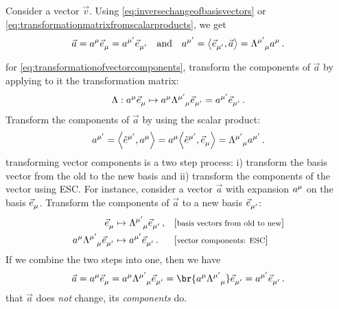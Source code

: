  Consider a vector $\vec v$. Using \cref{eq:inversechangeofbasisvectors} or \cref{eq:transformationmatrixfromscalarproducts}, we get
%
\begin{equation}\label{eq:transformationofvectorcomponents}
  \vec a = \tvec a\mu\tbvec\mu = \tvec a{\aidx\mu}\tbvec{\aidx\mu}\quad\text{and}\quad
  \tvec a{\aidx\mu} = \sprod{\tbvec{\aidx\mu}}{\vec a} = \ttransmat{\aidx\mu}{\mu}\tvec a\mu\,.
\end{equation}

 for \cref{eq:transformationofvectorcomponents}, transform the components of $\vec a$ by applying to it the transformation matrix:
%
\begin{equation*}
  \fdmap{\transmat}{\tvec a\mu\tbvec\mu}{\tvec a\mu\ttransmat{\aidx\mu}{\mu}\tbvec{\aidx\mu} = \tvec a{\aidx\mu}\tbvec{\aidx\mu}}\,.
\end{equation*}
%
Transform the components of $\vec a$ by using the scalar product:
%
\begin{equation*}
  \tvec a{\aidx\mu} = \sprod{\tbcov{\aidx\mu}}{\tvec a\mu}
                    = \tvec a\mu\sprod{\tbcov{\aidx\mu}}{\tbvec\mu}
                    = \ttransmat{\aidx\mu}{\mu}\tvec a{\aidx\mu}\,.
\end{equation*}
%
 transforming vector components is a two step process: i) transform the basis vector from the old to the new basis and ii) transform the components of the vector using ESC. For instance, consider a vector $\vec a$ with expansion $\tvec a\mu$ on the basis $\tbvec\mu$. Transform the components of $\vec a$ to a new basis $\tbvec{\aidx\mu}$:
%
\begin{align*}
  \tbvec\mu & \mapsto\ttransmat{\aidx\mu}\mu\tbvec{\aidx\mu}\,, 
    && \eqtxt{basis vectors from old to new} \\
  \tvec a\mu\ttransmat{\aidx\mu}\mu\tbvec{\aidx\mu} & \mapsto\tvec a{\aidx\mu}\tbvec{\aidx\mu}\,. 
    && \eqtxt{vector components: ESC}
\end{align*}
%
If we combine the two steps into one, then we have
%
\begin{equation*}
  \vec a = \tvec a\mu\tbvec\mu
         = \tvec a\mu\ttransmat{\aidx\mu}{\mu}\tbvec{\aidx\mu}
         = \br{\tvec a\mu\ttransmat{\aidx\mu}{\mu}}\tbvec{\aidx\mu}
         = \tvec a{\aidx\mu}\tbvec{\aidx\mu}\,.
\end{equation*}
%
 that $\vec a$ does \emph{not} change, its \emph{components} do.

